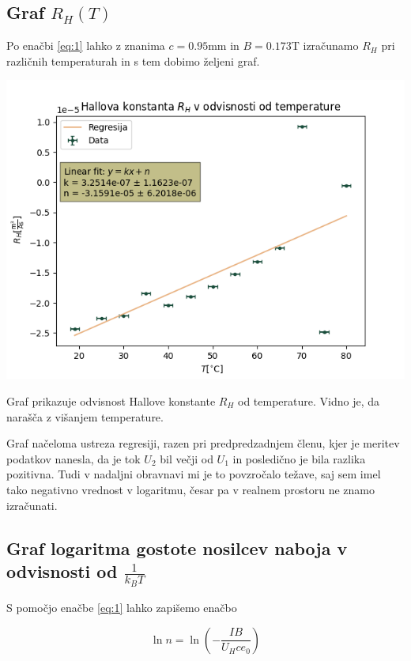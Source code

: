 \documentclass[11pt]{article}
\begin{document}
\subsection{Graf \(R_H (T)\)}\label{sec:org1e5d2b3}

Po enačbi \ref{eq:1} lahko z znanima \(c = 0.95 \mathrm{mm}\) in \(B = 0.173 \mathrm{T}\) izračunamo \(R_H\) pri različnih temperaturah in s tem dobimo željeni graf.

\begin{slika}[H]
\begin{center}
\includegraphics[width=.9\linewidth]{figures/hallovaKonstanta.png}
\end{center}
\caption{\small Graf prikazuje odvisnost Hallove konstante $R_{H}$ od temperature. Vidno je, da narašča z višanjem temperature.}
\end{slika}

Graf načeloma ustreza regresiji, razen pri predpredzadnjem členu, kjer je meritev podatkov nanesla, da je tok \(U_2\) bil večji od \(U_1\) in posledično je bila razlika pozitivna. Tudi v nadaljni obravnavi mi je to povzročalo težave, saj sem imel tako negativno vrednost v logaritmu, česar pa v realnem prostoru ne znamo izračunati.

\subsection{Graf logaritma gostote nosilcev naboja v odvisnosti od \(\frac{1}{k_B T}\)}\label{sec:org895ea45}

S pomočjo enačbe \ref{eq:1} lahko zapišemo enačbo

\[ \ln{n} = \ln \left( - \frac{IB}{U_H c e_0} \right)
\]
\end{document}
